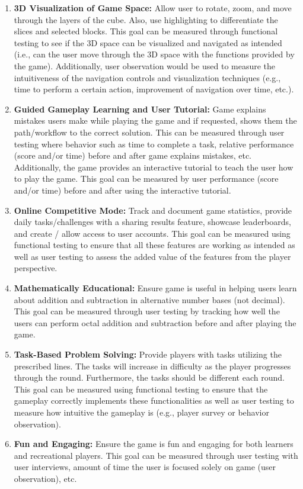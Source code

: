 \documentclass{article}
\begin{document}
\begin{enumerate}
    \item \textbf{3D Visualization of Game Space:} Allow user to rotate, zoom, and move through the layers of the cube. Also, use highlighting to differentiate the slices and selected blocks. This goal can be measured through functional testing to see if the 3D space can be visualized and navigated as intended (i.e., can the user move through the 3D space with the functions provided by the game). Additionally, user observation would be used to measure the intuitiveness of the navigation controls and visualization techniques (e.g., time to perform a certain action, improvement of navigation over time, etc.).
    \item \textbf{Guided Gameplay Learning and User Tutorial:} Game explains mistakes users make while playing the game and if requested, shows them the path/workflow to the correct solution. This can be measured through user testing where behavior such as time to complete a task, relative performance (score and/or time) before and after game explains mistakes, etc. Additionally, the game provides an interactive tutorial to teach the user how to play the game. This goal can be measured by user performance (score and/or time) before and after using the interactive tutorial.
    \item \textbf{Online Competitive Mode:} Track and document game statistics, provide daily tasks/challenges with a sharing results feature, showcase leaderboards, and create / allow access to user accounts. This goal can be measured using functional testing to ensure that all these features are working as intended as well as user testing to assess the added value of the features from the player perspective.
    \item \textbf{Mathematically Educational:} Ensure game is useful in helping users learn about addition and subtraction in alternative number bases (not decimal). This goal can be measured through user testing by tracking how well the users can perform octal addition and subtraction before and after playing the game.
    \item \textbf{Task-Based Problem Solving:} Provide players with tasks utilizing the prescribed lines. The tasks will increase in difficulty as the player progresses through the round. Furthermore, the tasks should be different each round. This goal can be measured using functional testing to ensure that the gameplay correctly implements these functionalities as well as user testing to measure how intuitive the gameplay is (e.g., player survey or behavior observation).
    \item \textbf{Fun and Engaging:} Ensure the game is fun and engaging for both learners and recreational players. This goal can be measured through user testing with user interviews, amount of time the user is focused solely on game (user observation), etc.
\end{enumerate}
\end{document}
